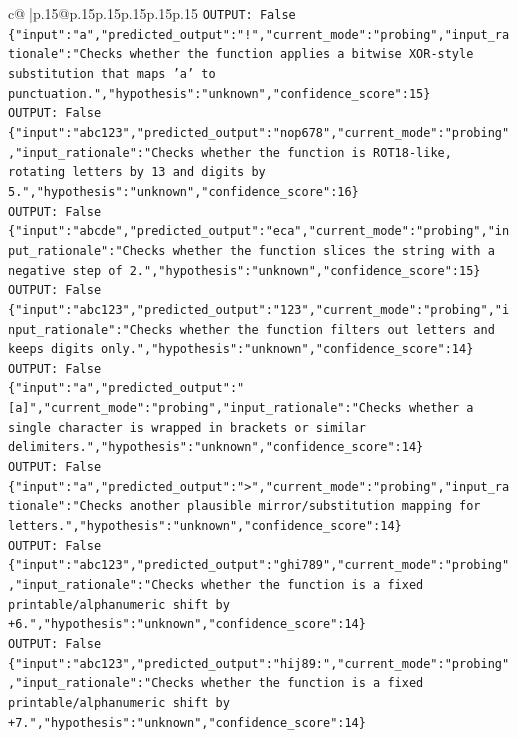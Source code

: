 \documentclass{article}
\begin{document}
{\begin{supertabular}{c@{$\;$}|p{.15\linewidth}@{}p{.15\linewidth}p{.15\linewidth}p{.15\linewidth}p{.15\linewidth}p{.15\linewidth}}
{{{\texttt{OUTPUT: False} \\
\texttt{\{"input":"a","predicted\_output":"!","current\_mode":"probing","input\_rationale":"Checks whether the function applies a bitwise XOR{-}style substitution that maps 'a' to punctuation.","hypothesis":"unknown","confidence\_score":15\}} \\
\texttt{OUTPUT: False} \\
\texttt{\{"input":"abc123","predicted\_output":"nop678","current\_mode":"probing","input\_rationale":"Checks whether the function is ROT18{-}like, rotating letters by 13 and digits by 5.","hypothesis":"unknown","confidence\_score":16\}} \\
\texttt{OUTPUT: False} \\
\texttt{\{"input":"abcde","predicted\_output":"eca","current\_mode":"probing","input\_rationale":"Checks whether the function slices the string with a negative step of 2.","hypothesis":"unknown","confidence\_score":15\}} \\
\texttt{OUTPUT: False} \\
\texttt{\{"input":"abc123","predicted\_output":"123","current\_mode":"probing","input\_rationale":"Checks whether the function filters out letters and keeps digits only.","hypothesis":"unknown","confidence\_score":14\}} \\
\texttt{OUTPUT: False} \\
\texttt{\{"input":"a","predicted\_output":"{[}a{]}","current\_mode":"probing","input\_rationale":"Checks whether a single character is wrapped in brackets or similar delimiters.","hypothesis":"unknown","confidence\_score":14\}} \\
\texttt{OUTPUT: False} \\
\texttt{\{"input":"a","predicted\_output":">","current\_mode":"probing","input\_rationale":"Checks another plausible mirror/substitution mapping for letters.","hypothesis":"unknown","confidence\_score":14\}} \\
\texttt{OUTPUT: False} \\
\texttt{\{"input":"abc123","predicted\_output":"ghi789","current\_mode":"probing","input\_rationale":"Checks whether the function is a fixed printable/alphanumeric shift by +6.","hypothesis":"unknown","confidence\_score":14\}} \\
\texttt{OUTPUT: False} \\
\texttt{\{"input":"abc123","predicted\_output":"hij89:","current\_mode":"probing","input\_rationale":"Checks whether the function is a fixed printable/alphanumeric shift by +7.","hypothesis":"unknown","confidence\_score":14\}} \\
}}}
\end{supertabular}}
\end{document}
